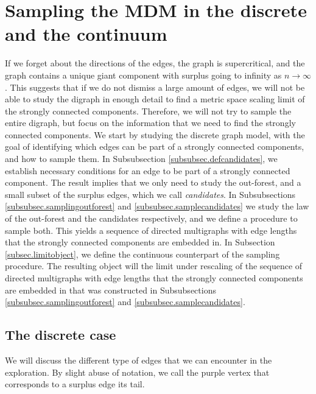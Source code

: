 \section{Sampling the MDM in the discrete and the continuum}
If we forget about the directions of the edges, the graph is supercritical, and the graph contains a unique giant component with surplus going to infinity as $n\to \infty$. This suggests that if we do not dismiss a large amount of edges, we will not be able to study the digraph in enough detail to find a metric space scaling limit of the strongly connected components. Therefore, we will not try to sample the entire digraph, but focus on the information that we need to find the strongly connected components. We start by studying the discrete graph model, with the goal of identifying which edges can be part of a strongly connected components, and how to sample them. In Subsubsection \ref{subsubsec.defcandidates}, we establish necessary conditions for an edge to be part of a strongly connected component. The result implies that we only need to study the out-forest, and a small subset of the surplus edges, which we call \emph{candidates}. In Subsubsections \ref{subsubsec.samplingoutforest} and \ref{subsubsec.samplecandidates} we study the law of the out-forest and the candidates respectively, and we define a procedure to sample both. This yields a sequence of directed multigraphs with edge lengths that the strongly connected components are embedded in.  
In Subsection \ref{subsec.limitobject}, we define the continuous counterpart of the sampling procedure. The resulting object will the limit under rescaling of the sequence of directed multigraphs with edge lengths that the strongly connected components are embedded in that was constructed in Subsubsections \ref{subsubsec.samplingoutforest} and \ref{subsubsec.samplecandidates}. 
\subsection{The discrete case}\label{subsec.discrete}
We will discuss the different type of edges that we can encounter in the exploration. By slight abuse of notation, we call the purple vertex that corresponds to a surplus edge its tail.

